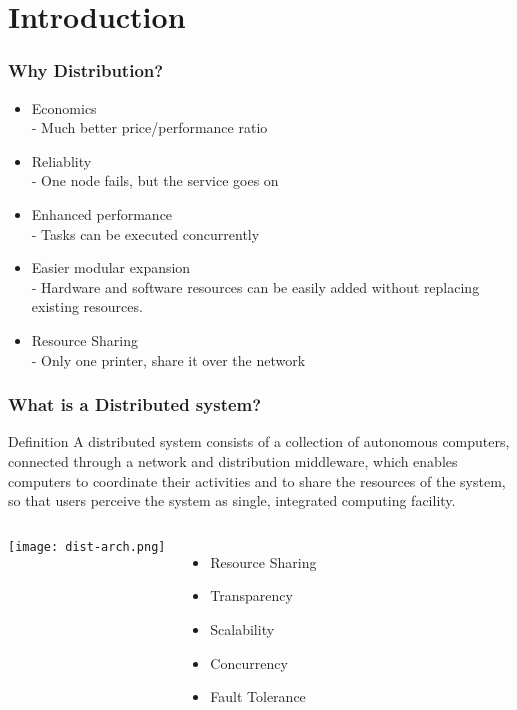 \section{Introduction}

\begin{frame}
    \frametitle{Why Distribution?}
    \begin{itemize}
        \item Economics \\
            - Much better price/performance ratio
        \item Reliablity \\
            - One node fails, but the service goes on
        \item Enhanced performance \\
            - Tasks can be executed concurrently
        \item Easier modular expansion \\
            - Hardware and software resources can be easily added without replacing existing resources.
        \item Resource Sharing \\
            - Only one printer, share it over the network
    \end{itemize}
\end{frame}

\begin{frame}
    \frametitle{What is a Distributed system?}
    \begin{block}{Definition}
    A distributed system consists of a \alert{collection of autonomous computers}, connected through a \alert{network} and distribution \alert{middleware}, which enables computers to coordinate their activities and to share the resources of the system, so that users perceive the system as single, integrated computing facility.
    \end{block}
    \begin{columns}
            \texttt{[image: dist-arch.png]}
            \begin{itemize}
                \item Resource Sharing
                \item Transparency
                \item Scalability
                \item Concurrency
                \item Fault Tolerance
            \end{itemize}
        \end{columns}
\end{frame}

